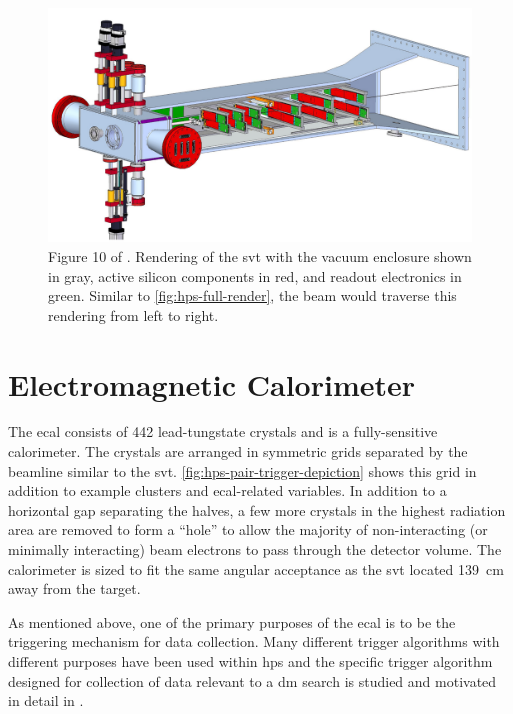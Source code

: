 \begin{figure}
	\centering
	\includegraphics*[width=\textwidth]{figures/hps/experiment/smkcarty-thesis-fig-10-svt-render.png}
	\caption{
		Figure 10 of \cite{skmccarty-thesis-2020}. Rendering of the \ac{svt} with the vacuum
		enclosure shown in gray, active silicon components in red, and readout electronics in
		green. Similar to \cref{fig:hps-full-render}, the beam would traverse this rendering
		from left to right.
	}
	\label{fig:hps-svt-render}
\end{figure}

\section{Electromagnetic Calorimeter}
\label{sec:hps-ecal}
The \ac{ecal} consists of \num{442} lead-tungstate crystals and is a fully-sensitive calorimeter.
The crystals are arranged in symmetric grids separated by the beamline similar to the \ac{svt}.
\cref{fig:hps-pair-trigger-depiction} shows this grid in addition to example clusters and \ac{ecal}-related
variables. In addition to a horizontal gap separating the halves, a few more crystals in the highest
radiation area are removed to form a ``hole'' to allow the majority of non-interacting (or minimally interacting)
beam electrons to pass through the detector volume. The calorimeter is sized to fit the same
angular acceptance as the \ac{svt} located \qty{139}{\cm} away from the target.

As mentioned above, one of the primary purposes of the \ac{ecal} is to be the triggering mechanism
for data collection. Many different trigger algorithms with different purposes have been used within
\ac{hps} and the specific trigger algorithm designed for collection of data relevant to a \ac{dm}
search is studied and motivated in detail in \cite{skmccarty-thesis-2020}.


